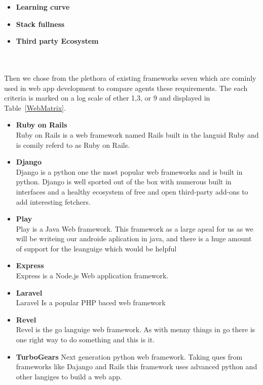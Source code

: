 \documentclass[Letter,11pt]{article}
\begin{document}
		\begin{minipage}[t]{0.5\textwidth}
		\begin{itemize}
			\item \textbf{Learning curve} \\
			
			
			\item \textbf{Stack fullness} \\
			
			\item \textbf{Third party Ecosystem}\\
			
			
		\end{itemize}
		\end{minipage}\\
		\\
		Then we chose from the plethora of existing frameworks seven which are cominly used in web app development to compare agents these requirements. The each criteria is marked on a log scale of ether 1,3, or 9 and displayed in Table~\ref{WebMatrix}.
		
		\begin{itemize}
			\item \textbf{Ruby on Rails} \\
			Ruby on Rails is a web framework named Rails built in the languid Ruby and is comily referd to as Ruby on Rails. 
			\item \textbf{Django} \\
			Django is a python one the most popular web frameworks and is built in python. Django is well sported out of the box with numerous built in interfaces and a healthy ecosystem of free and open third-party add-ons to add interesting fetchers.
			\item \textbf{Play} \\
			Play is a Java Web framework. This framework as a large apeal for us as we will be writeing our androide aplication in java, and there is a huge amount of support for the leanguige which would be helpful
			\item  \textbf{Express}\\
			Express is a Node.js Web application framework.
			\item \textbf{Laravel} \\
			Laravel Is a popular PHP baced web framework
			\item \textbf{Revel} \\
			Revel is the go languige web framework. As with menny things in go there is one right way to do something and this is it.
			\item \textbf{TurboGears}
			Next generation python web framework. Taking ques from frameworks like Dajango and Rails this framework uses advanced python and other langiges to build a web app.
		\end{itemize}
		
\end{document}
